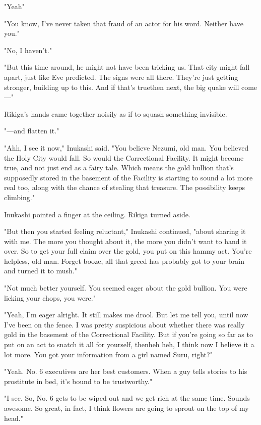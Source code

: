 "Yeah\el "

"You know, I've never taken that fraud of an actor for his word. Neither
have you."

"No, I haven't."

"But this time around, he might not have been tricking us. That city
might fall apart, just like Eve predicted. The signs were all there.
They're just getting stronger, building up to this. And if that's
true\el then next, the big quake will come---"

Rikiga's hands came together noisily as if to squash something
invisible.

"---and flatten it."

"Ahh, I see it now," Inukashi said. "You believe Nezumi, old man. You
believed the Holy City would fall. So would the Correctional Facility.
It might become true, and not just end as a fairy tale. Which means the
gold bullion that's supposedly stored in the basement of the Facility is
starting to sound a lot more real too, along with the chance of stealing
that treasure. The possibility keeps climbing."

Inukashi pointed a finger at the ceiling. Rikiga turned aside.

"But then you started feeling reluctant," Inukashi continued,
"about sharing it with me. The more you thought about it, the more you
didn't want to hand it over. So to get your full claim over the gold,
you put on this hammy act. You're helpless, old man. Forget booze, all
that greed has probably got to your brain and turned it to mush."

"Not much better yourself. You seemed eager about the gold bullion. You
were licking your chops, you were."

"Yeah, I'm eager alright. It still makes me drool. But let me tell you,
until now I've been on the fence. I was pretty suspicious about whether
there was really gold in the basement of the Correctional Facility. But
if you're going so far as to put on an act to snatch it all for
yourself, then\el heh heh, I think now I believe it a lot more. You got
your information from a girl named Suru, right?"

"Yeah. No. 6 executives are her best customers. When a guy tells stories
to his prostitute in bed, it's bound to be trustworthy."

"I see. So, No. 6 gets to be wiped out and we get rich at the same time.
Sounds awesome. So great, in fact, I think flowers are going to sprout
on the top of my head."

